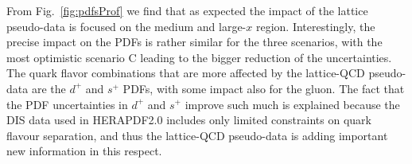 From Fig.~\ref{fig:pdfsProf} we find that as expected the
impact of the lattice pseudo-data is focused
on the medium and large-$x$ region.
%
Interestingly, the precise impact on the PDFs is rather
similar for the three scenarios, with the most optimistic
scenario C leading to the bigger reduction of
the uncertainties.
%
The quark flavor combinations that are more affected by the
lattice-QCD pseudo-data are the $d^{+}$ and $s^{+}$ PDFs,
with some impact also for the gluon.
%
The fact that the PDF uncertainties in $d^{+}$ and $s^{+}$
improve such much is explained because the DIS data
used in HERAPDF2.0 includes only limited constraints
on quark flavour separation, and thus the lattice-QCD
pseudo-data is adding important new information
in this respect.

